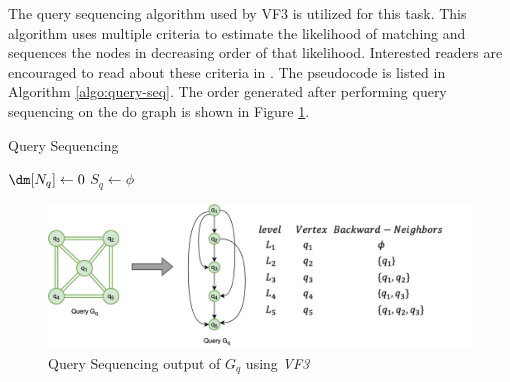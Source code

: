 The query sequencing algorithm used by VF3 \cite{VF3} is utilized for this task. This algorithm uses multiple criteria to estimate the likelihood of matching and sequences the nodes in decreasing order of that likelihood.
Interested readers are encouraged to read about these criteria in \cite{VF3}.
The pseudocode is listed in Algorithm \ref{algo:query-seq}.
The order generated after performing query sequencing on the do graph is shown in Figure \ref{fig:query-sequencing}.

\begin{algorithm}[h]
    \caption{Query Sequencing}
    \label{algo:query-seq}



    $\dm[N_q] \leftarrow 0$\;
    $S_q \leftarrow \phi$\;
\end{algorithm}



\begin{figure}
    \includegraphics[width=\textwidth]{fig/LR/query-sequencing.png}
    \caption{Query Sequencing output of $G_q$ using \textit{VF3}}
    \label{fig:query-sequencing}
\end{figure}

